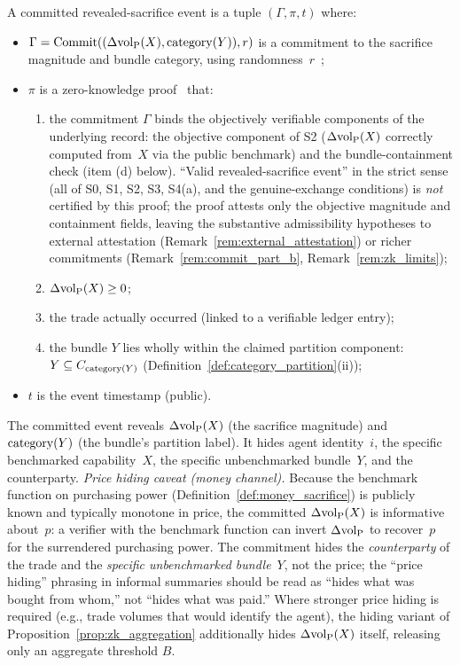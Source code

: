 \begin{definition}
\label{def:committed_event}
A committed revealed-sacrifice event is a tuple
$(\Gamma, \pi, t)$ where:
\begin{itemize}
\item $\Gamma = \mathrm{Commit}((\Delta{\operatorname{vol}_{\mathrm{P}}}(X), \mathrm{category}(Y)), r)$ is a
  commitment to the sacrifice magnitude and bundle category,
  using randomness~$r$~\citep[Definition~6]{lasser2026exo};
\item $\pi$ is a zero-knowledge
  proof~\citep[Definition~7]{lasser2026exo}
  that:
  \begin{enumerate}
  \item[(a)] the commitment $\Gamma$ binds the
    objectively verifiable components of the underlying
    record: the objective component of S2
    ($\Delta{\operatorname{vol}_{\mathrm{P}}}(X)$ correctly computed from~$X$ via the
    public benchmark) and the bundle-containment check
    (item (d) below).  ``Valid revealed-sacrifice event''
    in the strict sense (all of S0, S1, S2, S3, S4(a),
    and the genuine-exchange conditions) is \emph{not}
    certified by this proof; the proof attests only the
    objective magnitude and containment fields, leaving
    the substantive admissibility hypotheses to external
    attestation (Remark~\ref{rem:external_attestation}) or
    richer commitments
    (Remark~\ref{rem:commit_part_b}, Remark~\ref{rem:zk_limits});
  \item[(b)] $\Delta{\operatorname{vol}_{\mathrm{P}}}(X) \geq 0$;
  \item[(c)] the trade actually occurred (linked to a verifiable
    ledger entry);
  \item[(d)] the bundle $Y$ lies wholly within the claimed
    partition component: $Y \subseteq C_{\mathrm{category}(Y)}$
    (Definition~\ref{def:category_partition}(ii));
  \end{enumerate}
\item $t$ is the event timestamp (public).
\end{itemize}

The committed event reveals $\Delta{\operatorname{vol}_{\mathrm{P}}}(X)$ (the sacrifice
magnitude) and $\mathrm{category}(Y)$ (the bundle's partition label).  It hides
agent identity~$i$, the specific benchmarked capability~$X$, the
specific unbenchmarked bundle~$Y$, and the counterparty.
\emph{Price hiding caveat (money channel).}  Because the
benchmark function on purchasing power
(Definition~\ref{def:money_sacrifice}) is publicly known and
typically monotone in price, the committed
$\Delta{\operatorname{vol}_{\mathrm{P}}}(X)$ is informative about~$p$: a verifier with the
benchmark function can invert $\Delta{\operatorname{vol}_{\mathrm{P}}}$ to recover~$p$ for
the surrendered purchasing power.  The commitment hides the
\emph{counterparty} of the trade and the \emph{specific
unbenchmarked bundle}~$Y$, not the price; the
``price hiding'' phrasing in informal summaries should be
read as ``hides what was bought from whom,'' not ``hides what
was paid.''  Where stronger price hiding is required (e.g.,
trade volumes that would identify the agent), the hiding
variant of Proposition~\ref{prop:zk_aggregation} additionally
hides $\Delta{\operatorname{vol}_{\mathrm{P}}}(X)$ itself, releasing only an aggregate
threshold $B$.
\end{definition}

